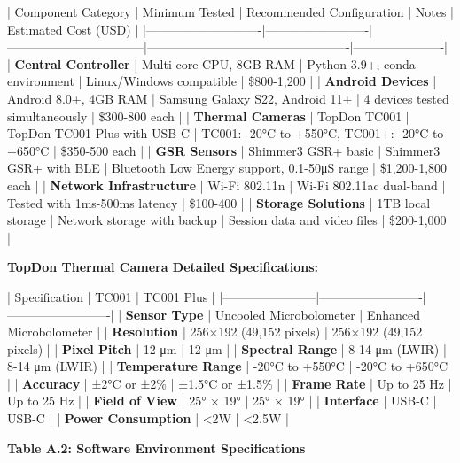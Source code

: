 \documentclass[12pt,a4paper]{article}
\begin{document}
| Component Category         | Minimum Tested          | Recommended Configuration       | Notes                                           | Estimated Cost (USD) |
|----------------------------|-------------------------|---------------------------------|-------------------------------------------------|----------------------|
| \textbf{Central Controller}     | Multi-core CPU, 8GB RAM | Python 3.9+, conda environment  | Linux/Windows compatible                        | \$800-1,200           |
| \textbf{Android Devices}        | Android 8.0+, 4GB RAM   | Samsung Galaxy S22, Android 11+ | 4 devices tested simultaneously                 | \$300-800 each        |
| \textbf{Thermal Cameras}        | TopDon TC001            | TopDon TC001 Plus with USB-C    | TC001: -20°C to +550°C, TC001+: -20°C to +650°C | \$350-500 each        |
| \textbf{GSR Sensors}            | Shimmer3 GSR+ basic     | Shimmer3 GSR+ with BLE          | Bluetooth Low Energy support, 0.1-50μS range    | \$1,200-1,800 each    |
| \textbf{Network Infrastructure} | Wi-Fi 802.11n           | Wi-Fi 802.11ac dual-band        | Tested with 1ms-500ms latency                   | \$100-400             |
| \textbf{Storage Solutions}      | 1TB local storage       | Network storage with backup     | Session data and video files                    | \$200-1,000           |

\textbf{TopDon Thermal Camera Detailed Specifications:}

| Specification         | TC001                   | TC001 Plus              |
|-----------------------|-------------------------|-------------------------|
| \textbf{Sensor Type}       | Uncooled Microbolometer | Enhanced Microbolometer |
| \textbf{Resolution}        | 256×192 (49,152 pixels) | 256×192 (49,152 pixels) |
| \textbf{Pixel Pitch}       | 12 μm                   | 12 μm                   |
| \textbf{Spectral Range}    | 8-14 μm (LWIR)          | 8-14 μm (LWIR)          |
| \textbf{Temperature Range} | -20°C to +550°C         | -20°C to +650°C         |
| \textbf{Accuracy}          | ±2°C or ±2\%             | ±1.5°C or ±1.5\%         |
| \textbf{Frame Rate}        | Up to 25 Hz             | Up to 25 Hz             |
| \textbf{Field of View}     | 25° × 19°               | 25° × 19°               |
| \textbf{Interface}         | USB-C                   | USB-C                   |
| \textbf{Power Consumption} | <2W                     | <2.5W                   |

\textbf{Table A.2: Software Environment Specifications}
\end{document}
